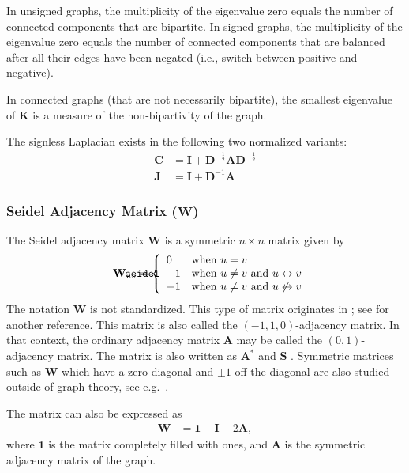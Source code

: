 \documentclass{article}
\def\mathnote#1{%
  \tag*{\rlap{\hspace\marginparsep\smash{\parbox[t]{\marginparwidth}{#1}}}}
}
\begin{document}
In unsigned graphs, the multiplicity of the eigenvalue zero equals the
number of connected components that are bipartite.  
In signed graphs, the multiplicity of the eigenvalue zero equals the
number of connected components that are balanced after all their edges
have been negated (i.e., switch between positive and negative). 

In connected graphs (that are not necessarily bipartite), the smallest
eigenvalue of $\mathbf K$ is a measure of the non-bipartivity of the
graph. 

The signless Laplacian exists in the following two normalized variants:
\begin{align}
  \mathbf C &= \mathbf I + \mathbf D^{-\frac 12}\mathbf A\mathbf D^{-\frac 12} \\
  \mathbf J &= \mathbf I + \mathbf D^{-1} \mathbf A
\end{align}

\subsubsection{Seidel Adjacency Matrix ($\mathbf W$)}
The Seidel adjacency matrix $\mathbf W$ is a symmetric $n \times n$ matrix given by 
\begin{align}
  \mathnote{\texttt{seidel}}
  \mathbf W_{uv} &= 
  \left\{ \begin{array}{ll}
    0  & \text{when $u=v$} \\
    -1 & \text{when $u \neq v$ and $u \leftrightarrow v$} \\
    +1 & \text{when $u \neq v$ and $u \not\leftrightarrow v$} \\
  \end{array} \right.
\end{align}
The notation $\mathbf W$ is not standardized. 
This type of matrix originates in \citep{b906}; see \citep{b907} for
another reference.  This matrix is also called the $(-1,1,0)$-adjacency
matrix.  
In that context, the ordinary adjacency matrix $\mathbf A$ may be called
the $(0,1)$-adjacency matrix. 
The matrix is also written as $\mathbf A^*$ \citep[e.g.\ in][]{b908} and
$\mathbf S$ \citep[e.g.\ in][]{b909}. 
Symmetric matrices such as $\mathbf W$ which have a zero diagonal and $\pm 1$ off
the diagonal are also studied outside of graph theory, see
e.g.\ \cite{b912}. 

The matrix can also be expressed as
\begin{align}
  \mathbf W &= \mathbf 1 - \mathbf I - 2 \mathbf A,
\end{align}
where $\mathbf 1$ is the matrix completely filled with ones, and
$\mathbf A$ is the symmetric adjacency matrix of the graph.
\end{document}
